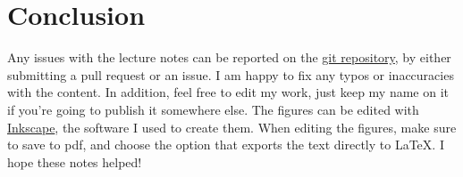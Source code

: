\chapter*{Conclusion}
Any issues with the lecture notes can be reported on the \href{https://github.com/meshkinyar/lecture-notes}{git repository}, by either submitting a pull request or an issue. I am happy to fix any typos or inaccuracies with the content. In addition, feel free to edit my work, just keep my name on it if you're going to publish it somewhere else. The figures can be edited with \href{https://inkscape.org/}{Inkscape}, the software I used to create them. When editing the figures, make sure to save to pdf, and choose the option that exports the text directly to \LaTeX. I hope these notes helped! 
